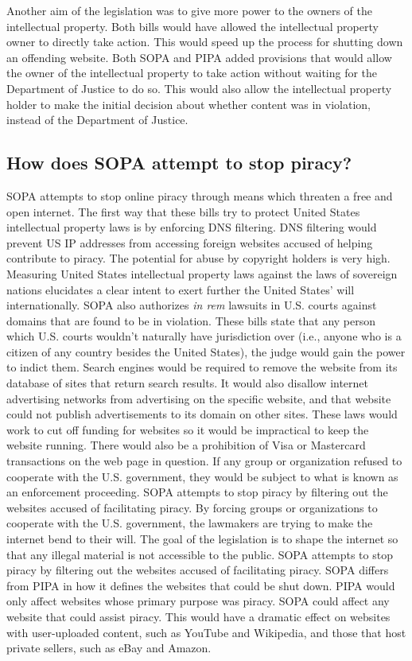 \documentclass[11pt,journal,compsoc]{IEEEtran}
\begin{document}
\indent Another aim of the legislation was to give more power to the owners of the intellectual property. Both bills would have allowed the intellectual property owner to directly take action. This would speed up the process for shutting down an offending website. Both SOPA and PIPA added provisions that would allow the owner of the intellectual property to take action without waiting for the Department of Justice to do so. This would also allow the intellectual property holder to make the initial decision about whether content was in violation, instead of the Department of Justice. 


\subsection{How does SOPA attempt to stop piracy?}
SOPA attempts to stop online piracy through means which threaten a free and open internet. The first way that these bills try to protect United States intellectual property laws is by enforcing DNS filtering. DNS filtering would prevent US IP addresses from accessing foreign websites accused of helping contribute to piracy. The potential for abuse by copyright holders is very high. Measuring United States intellectual property laws against the laws of sovereign nations elucidates a clear intent to exert further the United States' will internationally. SOPA also authorizes \textit{in rem} lawsuits in U.S. courts against domains that are found to be in violation. These bills state that any person which U.S. courts wouldn't naturally have jurisdiction over (i.e., anyone who is a citizen of any country besides the United States), the judge would gain the power to indict them. Search engines would be required to remove the website from its database of sites that return search results. It would also disallow internet advertising networks from advertising on the specific website, and that website could not publish advertisements to its domain on other sites. These laws would work to cut off funding for websites so it would be impractical to keep the website running. There would also be a prohibition of Visa or Mastercard transactions on the web page in question. If any group or organization refused to cooperate with the U.S. government, they would be subject to what is known as an enforcement proceeding. SOPA attempts to stop piracy by filtering out the websites accused of facilitating piracy. By forcing groups or organizations to cooperate with the U.S. government, the lawmakers are trying to make the internet bend to their will. The goal of the legislation is to shape the internet so that any illegal material is not accessible to the public. SOPA attempts to stop piracy by filtering out the websites accused of facilitating piracy.
\indent SOPA differs from PIPA in how it defines the websites that could be shut down. PIPA would only affect websites whose primary purpose was piracy. SOPA could affect any website that could assist piracy. This would have a dramatic effect on websites with user-uploaded content, such as YouTube and Wikipedia, and those that host private sellers, such as eBay and Amazon. 
\end{document}
